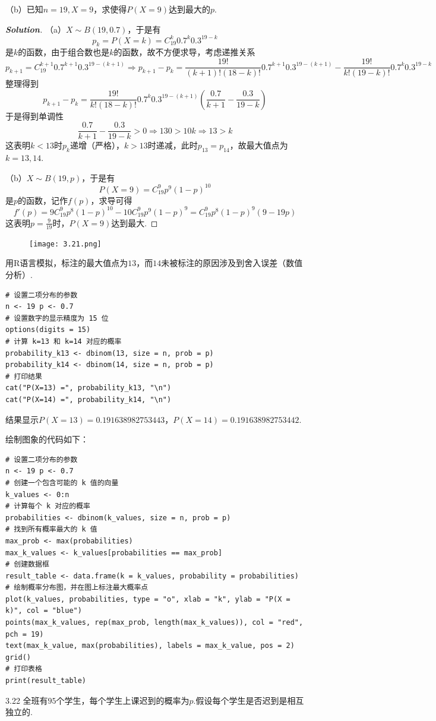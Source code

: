 \documentclass[10pt, a4paper, oneside]{ctexart}
\newenvironment{solution}{\begin{proof}[\bf Solution]}{\end{proof}}
\begin{document}
（b）已知$n=19,X=9$，求使得$P(X=9)$达到最大的$p$.
\begin{solution}
（a）$X\sim B(19,0.7)$，于是有
\[{p_k} = P(X = k) = C_{19}^k{0.7^k}{0.3^{19 - k}}\]
是$k$的函数，由于组合数也是$k$的函数，故不方便求导，考虑递推关系
\[{p_{k + 1}} = C_{19}^{k + 1}{0.7^{k + 1}}{0.3^{19 - (k + 1)}} \Rightarrow {p_{k + 1}} - {p_k} = \frac{{19!}}{{(k + 1)!(18 - k)!}}{0.7^{k + 1}}{0.3^{19 - (k + 1)}} - \frac{{19!}}{{k!(19 - k)!}}{0.7^k}{0.3^{19 - k}}\]
整理得到
\[{p_{k + 1}} - {p_k} = \frac{{19!}}{{k!(18 - k)!}}{0.7^k}{0.3^{19 - (k + 1)}}\left( {\frac{{0.7}}{{k + 1}} - \frac{{0.3}}{{19 - k}}} \right)\]
于是得到单调性
\[\frac{{0.7}}{{k + 1}} - \frac{{0.3}}{{19 - k}} > 0 \Rightarrow 130 > 10k \Rightarrow 13 > k\]
这表明$k< 13$时$p_k$递增（严格），$k>13$时递减，此时$p_{13}=p_{14}$，故最大值点为$k=13,14$.

（b）$X\sim B(19,p)$，于是有
\[P(X = 9) = C_{19}^9{p^9}{(1 - p)^{10}}\]
是$p$的函数，记作$f(p)$，求导可得
\[f'(p) = 9C_{19}^9{p^8}{(1 - p)^{10}} - 10C_{19}^9{p^9}{(1 - p)^9} = C_{19}^9{p^8}{(1 - p)^9}(9 - 19p)\]
这表明$p=\frac{9}{19}$时，$P(X=9)$达到最大.
\end{solution}
\begin{figure}[H]
    \centering
    \texttt{[image: 3.21.png]}
\end{figure}
用R语言模拟，标注的最大值点为$13$，而$14$未被标注的原因涉及到舍入误差（数值分析）.
\begin{lstlisting}
# 设置二项分布的参数
n <- 19 p <- 0.7
# 设置数字的显示精度为 15 位
options(digits = 15)
# 计算 k=13 和 k=14 对应的概率
probability_k13 <- dbinom(13, size = n, prob = p)
probability_k14 <- dbinom(14, size = n, prob = p)
# 打印结果
cat("P(X=13) =", probability_k13, "\n")
cat("P(X=14) =", probability_k14, "\n")
\end{lstlisting}
结果显示$P(X=13)=0.191638982753443$，$P(X=14)=0.191638982753442$.

绘制图象的代码如下：
\begin{lstlisting}
# 设置二项分布的参数
n <- 19 p <- 0.7
# 创建一个包含可能的 k 值的向量
k_values <- 0:n
# 计算每个 k 对应的概率
probabilities <- dbinom(k_values, size = n, prob = p)
# 找到所有概率最大的 k 值
max_prob <- max(probabilities)
max_k_values <- k_values[probabilities == max_prob]
# 创建数据框
result_table <- data.frame(k = k_values, probability = probabilities)
# 绘制概率分布图，并在图上标注最大概率点
plot(k_values, probabilities, type = "o", xlab = "k", ylab = "P(X = k)", col = "blue")
points(max_k_values, rep(max_prob, length(max_k_values)), col = "red", pch = 19)
text(max_k_value, max(probabilities), labels = max_k_value, pos = 2)
grid()
# 打印表格
print(result_table)
\end{lstlisting}
3.22 全班有$95$个学生，每个学生上课迟到的概率为$p$.假设每个学生是否迟到是相互独立的.
\end{document}
